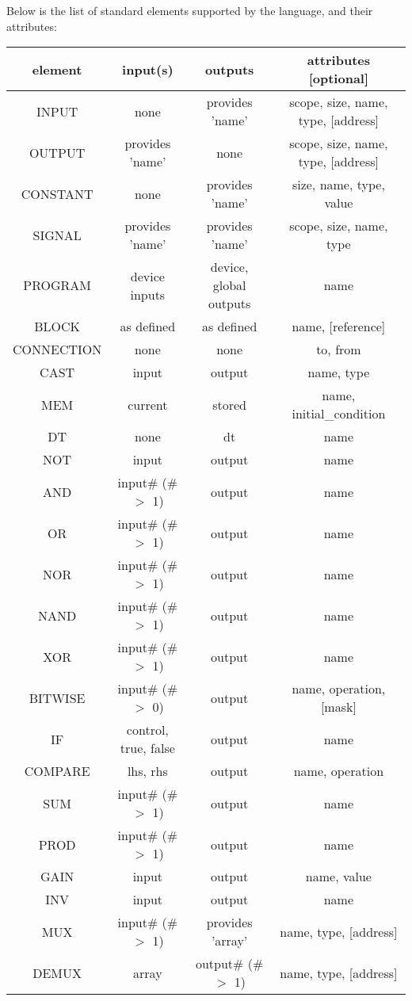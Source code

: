 Below is the list of standard elements supported by the language, and their attributes:
\begin{longtable}[c]{ |c|c|c|c| } 
    \hline
    element & input(s) & outputs & attributes [optional]  \\ 
    \hline\hline
    INPUT & none & provides 'name' & scope, size, name, type, [address] \\ 
    OUTPUT & provides 'name' & none & scope, size, name, type, [address] \\ 
    CONSTANT & none & provides 'name' & size, name, type, value \\ 
    SIGNAL & provides 'name' & provides 'name' & scope, size, name, type \\ 
    \hline
    PROGRAM & device inputs & device, global outputs & name \\ 
    BLOCK & as defined & as defined & name, [reference] \\ 
    CONNECTION & none & none & to, from \\
    \hline
    CAST & input & output & name, type \\
    MEM & current & stored & name, initial\_condition \\
    DT & none & dt & name \\
    NOT & input & output & name \\
    AND & input\# (\# $>$ 1) & output & name \\
    OR & input\# (\# $>$ 1) & output & name \\
    NOR & input\# (\# $>$ 1) & output & name \\
    NAND & input\# (\# $>$ 1) & output & name \\
    XOR & input\# (\# $>$ 1) & output & name \\
    BITWISE & input\# (\# $>$ 0) & output & name, operation, [mask] \\
    IF & control, true, false & output & name \\
    COMPARE & lhs, rhs  & output & name, operation \\
    SUM & input\# (\# $>$ 1) & output & name \\
    PROD & input\# (\# $>$ 1) & output & name \\
    GAIN & input & output & name, value \\
    INV & input & output & name \\
    \hline
    MUX & input\# (\# $>$ 1) & provides 'array' & name, type, [address] \\
    DEMUX & array & output\# (\# $>$ 1) & name, type, [address] \\

\end{longtable}

